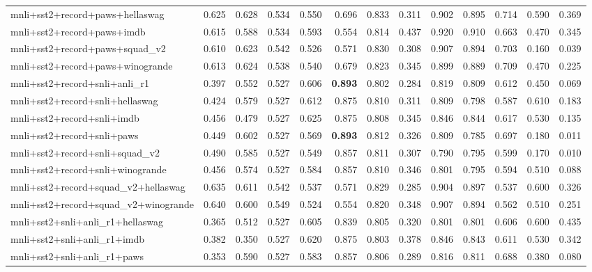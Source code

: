 \begin{table}[t]
\begin{tabular}{lrrrrrrrrrrrr}
    mnli+sst2+record+paws+hellaswag & 0.625 & 0.628 & 0.534 & 0.550 & 0.696 & 0.833 & 0.311 & 0.902 & 0.895 & 0.714 & 0.590 & 0.369 \\
    mnli+sst2+record+paws+imdb & 0.615 & 0.588 & 0.534 & 0.593 & 0.554 & 0.814 & 0.437 & 0.920 & 0.910 & 0.663 & 0.470 & 0.345 \\
    mnli+sst2+record+paws+squad\_v2 & 0.610 & 0.623 & 0.542 & 0.526 & 0.571 & 0.830 & 0.308 & 0.907 & 0.894 & 0.703 & 0.160 & 0.039 \\
    mnli+sst2+record+paws+winogrande & 0.613 & 0.624 & 0.538 & 0.540 & 0.679 & 0.823 & 0.345 & 0.899 & 0.889 & 0.709 & 0.470 & 0.225 \\
    mnli+sst2+record+snli+anli\_r1 & 0.397 & 0.552 & 0.527 & 0.606 & \textbf{0.893} & 0.802 & 0.284 & 0.819 & 0.809 & 0.612 & 0.450 & 0.069 \\
    mnli+sst2+record+snli+hellaswag & 0.424 & 0.579 & 0.527 & 0.612 & 0.875 & 0.810 & 0.311 & 0.809 & 0.798 & 0.587 & 0.610 & 0.183 \\
    mnli+sst2+record+snli+imdb & 0.456 & 0.479 & 0.527 & 0.625 & 0.875 & 0.808 & 0.345 & 0.846 & 0.844 & 0.617 & 0.530 & 0.135 \\
    mnli+sst2+record+snli+paws & 0.449 & 0.602 & 0.527 & 0.569 & \textbf{0.893} & 0.812 & 0.326 & 0.809 & 0.785 & 0.697 & 0.180 & 0.011 \\
    mnli+sst2+record+snli+squad\_v2 & 0.490 & 0.585 & 0.527 & 0.549 & 0.857 & 0.811 & 0.307 & 0.790 & 0.795 & 0.599 & 0.170 & 0.010 \\
    mnli+sst2+record+snli+winogrande & 0.456 & 0.574 & 0.527 & 0.584 & 0.857 & 0.810 & 0.346 & 0.801 & 0.795 & 0.594 & 0.510 & 0.088 \\
    mnli+sst2+record+squad\_v2+hellaswag & 0.635 & 0.611 & 0.542 & 0.537 & 0.571 & 0.829 & 0.285 & 0.904 & 0.897 & 0.537 & 0.600 & 0.326 \\
    mnli+sst2+record+squad\_v2+winogrande & 0.640 & 0.600 & 0.549 & 0.524 & 0.554 & 0.820 & 0.348 & 0.907 & 0.894 & 0.562 & 0.510 & 0.251 \\
    mnli+sst2+snli+anli\_r1+hellaswag & 0.365 & 0.512 & 0.527 & 0.605 & 0.839 & 0.805 & 0.320 & 0.801 & 0.801 & 0.606 & 0.600 & 0.435 \\
    mnli+sst2+snli+anli\_r1+imdb & 0.382 & 0.350 & 0.527 & 0.620 & 0.875 & 0.803 & 0.378 & 0.846 & 0.843 & 0.611 & 0.530 & 0.342 \\
    mnli+sst2+snli+anli\_r1+paws & 0.353 & 0.590 & 0.527 & 0.583 & 0.857 & 0.806 & 0.289 & 0.816 & 0.811 & 0.688 & 0.380 & 0.080 \\

\end{tabular}
\end{table}
